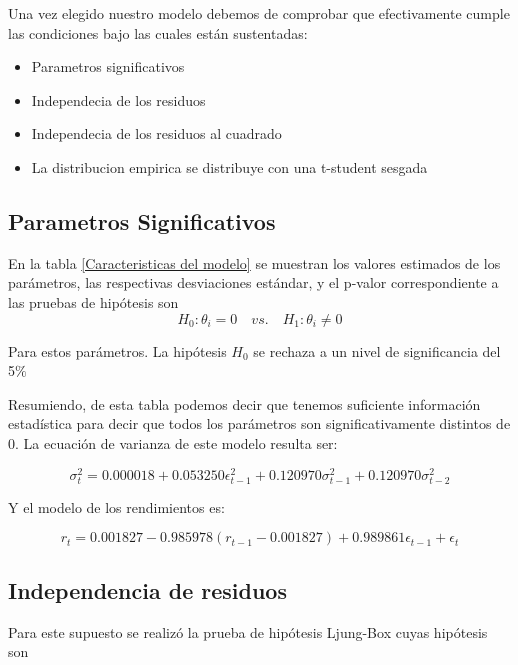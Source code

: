 
Una vez elegido nuestro modelo debemos de comprobar que efectivamente cumple las condiciones bajo las cuales están sustentadas:

\begin{itemize}
    \item Parametros significativos 
    \item Independecia de los residuos
    \item Independecia de los residuos al cuadrado 
    \item La distribucion empirica se distribuye con una t-student sesgada  

\end{itemize}

\bigskip
\subsection{Parametros Significativos}
\bigskip
En la tabla \ref{Caracteristicas del modelo} se muestran los valores estimados de los parámetros, las respectivas desviaciones estándar, y el p-valor correspondiente a las pruebas de hipótesis son 
\bigskip
$$H_0:\theta_i =0 \quad vs.\quad H_1:\theta_i \not= 0$$

\newpage

   Para estos parámetros. La hipótesis $H_{0}$ se rechaza a un nivel de significancia del 5$\%$
   


 
 Resumiendo, de esta tabla podemos decir que tenemos suficiente información estadística para decir que todos  los parámetros son significativamente distintos de 0. La ecuación de varianza de este modelo resulta ser:
 
 \begin{equation}
   \sigma_t^2 =0.000018+  0.053250  \epsilon_{t-1}^2 + 0.120970  \sigma_{t-1}^2 + 0.120970  \sigma_{t-2}^2
\end{equation}

Y el modelo de los rendimientos es:

 \begin{equation}
   r_t =  0.001827 - 0.985978(r_{t-1} - 0.001827) + 0.989861\epsilon_{t-1} +  \epsilon_t
\end{equation}



 \subsection{Independencia de residuos}
 Para este supuesto se realizó la prueba de hipótesis Ljung-Box cuyas hipótesis son 
 
